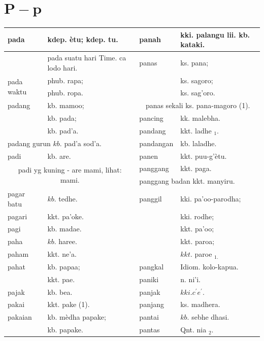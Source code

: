 \documentclass[10pt]{article}
\begin{document}
\section*{\(\mathbf{P}-\mathbf{p}\)}
\begin{center}
\begin{tabular}{|l|l|l|l|}
\hline
pada & kdep. ètu; kdep. tu. & panah & kki. palangu lii. kb. kataki. \\
\hline
 & pada suatu hari Time. ca lodo hari. & panas & ks. pana; \\
\hline
\multirow[t]{2}{*}{pada waktu} & phub. rapa; &  & ks. sagoro; \\
\hline
 & phub. ropa. &  & ks. sag'oro. \\
\hline
padang & kb. mamoo; & \multicolumn{2}{|c|}{panas sekali ks. pana-magoro (1).} \\
\hline
 & kb. pada; & pancing & kk. malebha. \\
\hline
 & kb. pad'a. & pandang & kkt. ladhe \({ }_{1}\). \\
\hline
\multicolumn{2}{|l|}{padang gurun \(k b\). pad'a sod'a.} & pandangan & kb. laladhe. \\
\hline
padi & kb. are. & panen & kkt. puu-g'ètu. \\
\hline
\multicolumn{2}{|c|}{\multirow{2}{*}{padi yg kuning - are mami, lihat: mami.}} & panggang & kkt. paga. \\
\hline
 &  & \multicolumn{2}{|l|}{panggang badan kkt. manyiru.} \\
\hline
pagar batu & \(k b\). tedhe. & panggil & kki. pa'oo-parodha; \\
\hline
pagari & kkt. pa'oke. &  & kki. rodhe; \\
\hline
pagi & kb. madae. &  & kkt. pa'oo; \\
\hline
paha & \(k b\). haree. &  & kkt. paroa; \\
\hline
paham & kkt. ne'a. &  & \(k k t\). paroe \(_{1 .}\) \\
\hline
pahat & kb. papaa; & pangkal & Idiom. kolo-kapua. \\
\hline
 & kkt. pae. & paniki & n. ni'i. \\
\hline
pajak & kb. bea. & panjak & \(k k i . c^{\prime} e^{\prime}\). \\
\hline
pakai & kkt. pake (1). & panjang & ks. madhera. \\
\hline
pakaian & kb. mèdha papake; & pantai & \(k b\). sebhe dhasi. \\
\hline
 & kb. papake. & pantas & Qnt. nia \({ }_{2}\). \\

\end{tabular}
\end{center}
\end{document}
